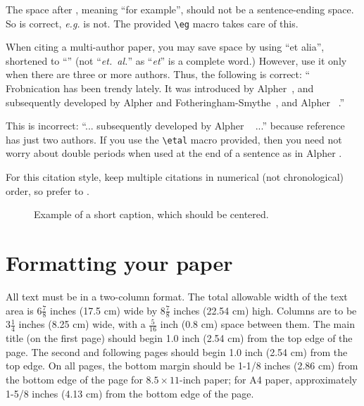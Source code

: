 \documentclass[10pt,twocolumn,letterpaper]{article}
\begin{document}
The space after \eg, meaning ``for example'', should not be a
sentence-ending space. So \eg is correct, {\em e.g.} is not.  The
provided \verb'\eg' macro takes care of this.

When citing a multi-author paper, you may save space by using ``et
alia'', shortened to ``\etal'' (not ``{\em et.\ al.}'' as ``{\em et}''
is a complete word.)  However, use it only when there are three or
more authors.  Thus, the following is correct: `` Frobnication has
been trendy lately.  It was introduced by Alpher~\cite{Alpher02}, and
subsequently developed by Alpher and
Fotheringham-Smythe~\cite{Alpher03}, and Alpher
\etal~\cite{Alpher04}.''

This is incorrect: ``... subsequently developed by Alpher
\etal~\cite{Alpher03} ...''  because reference~\cite{Alpher03} has
just two authors.  If you use the \verb'\etal' macro provided, then
you need not worry about double periods when used at the end of a
sentence as in Alpher \etal.

For this citation style, keep multiple citations in numerical (not
chronological) order, so prefer \cite{Alpher03,Alpher02,Authors12} to
\cite{Alpher02,Alpher03,Authors12}.


\begin{figure}
  \begin{center}
    \fbox{\rule{0pt}{2in} \rule{.9\linewidth}{0pt}}
  \end{center}
  \caption{Example of a short caption, which should be centered.}
  \label{fig:short}
\end{figure}

\section{Formatting your paper}

All text must be in a two-column format. The total allowable width of
the text area is $6\frac78$ inches (17.5 cm) wide by $8\frac78$ inches
(22.54 cm) high. Columns are to be $3\frac14$ inches (8.25 cm) wide,
with a $\frac{5}{16}$ inch (0.8 cm) space between them. The main title
(on the first page) should begin 1.0 inch (2.54 cm) from the top edge
of the page. The second and following pages should begin 1.0 inch
(2.54 cm) from the top edge. On all pages, the bottom margin should be
1-1/8 inches (2.86 cm) from the bottom edge of the page for $8.5
\times 11$-inch paper; for A4 paper, approximately 1-5/8 inches (4.13
cm) from the bottom edge of the page.
\end{document}
